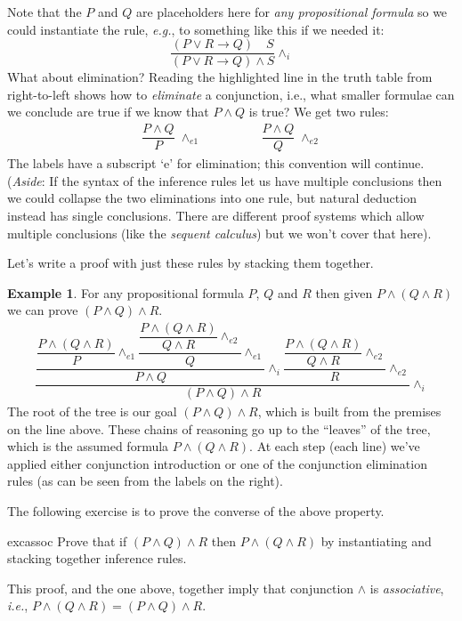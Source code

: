 \documentclass{article}
\theoremstyle{definition}
\newtheorem{example}{Example}
\newcommand{\ie}{\emph{i.e.}}
\newcommand{\eg}{\emph{e.g.}}
\begin{document}
Note that the $P$ and $Q$ are placeholders here for \emph{any
  propositional formula} so we could instantiate the rule, \eg{},
to something like this if we needed it:
%
\begin{equation*}
\dfrac{(P \vee R \rightarrow Q) \quad S}
      {(P \vee R \rightarrow Q) \wedge S} {\wedge_i}
\end{equation*}
%
What about elimination?
Reading the highlighted line in the truth table from right-to-left shows how to
\emph{eliminate} a conjunction, i.e., what smaller formulae
can we conclude are true if we know that $P \wedge Q$ is true? We get
two rules:
%
\begin{align*}
  \dfrac{P \wedge Q}
        {P} \; {\wedge_{e1}}
  \qquad & \qquad
      \dfrac{P \wedge Q}
        {Q} \; {\wedge_{e2}}
\end{align*}
%
The labels have a subscript `e' for elimination; this convention will
continue.  (\emph{Aside}: If the syntax of the inference rules let us
have multiple conclusions then we could collapse the two eliminations
into one rule, but natural deduction instead has single
conclusions. There are different proof systems which allow
multiple conclusions (like the \emph{sequent calculus}) but we won't cover that here).

Let's write a proof with just these rules by stacking them together.

\begin{example}
\label{exm:assoc-conj}
  For any propositional formula $P$, $Q$ and $R$ then given $P \wedge (Q \wedge
  R)$ we can prove $(P \wedge Q) \wedge R$.
%
\newcommand{\conge}[1]{\wedge_{e#1}}
  \begin{align*}
    \dfrac{
    \dfrac{\dfrac{P \wedge (Q \wedge R)}
    {P}\conge{1}
    \dfrac{\dfrac{P \wedge (Q \wedge R)}
    {Q \wedge R} \conge{2}}{Q} \conge{1}}
    {P \wedge Q} {\wedge_i}
    \dfrac{\dfrac{P \wedge (Q \wedge R)}
    {Q \wedge R} \conge{2}}{R} \conge{2}}
    {(P \wedge Q) \wedge R} {\wedge_i}
  \end{align*}
The root of the tree is our goal $(P \wedge Q) \wedge R$, which is
built from the premises on the line above. These chains of reasoning
go up to the ``leaves'' of the tree, which is the assumed formula
$P \wedge (Q \wedge R)$. At each step (each line) we've applied
either conjunction introduction or one of the conjunction elimination
rules (as can be seen from the labels on the right).
\end{example}
\noindent
The following exercise is to prove the converse of the above property.
%
\begin{restatable}{exc}{assoc}
  \label{exm:assoc}
  Prove that if $(P \wedge Q) \wedge R$ then
  $P \wedge (Q \wedge R)$ by instantiating and stacking
  together inference rules.
\end{restatable}
%
This proof, and the one above, together imply that conjunction
$\wedge$ is \emph{associative}, \ie{},
$P \wedge (Q \wedge R) = (P \wedge Q) \wedge R$.
\end{document}
